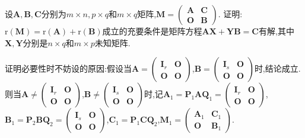 \documentclass[../../main.tex]{subfiles}%
\begin{document}
\begin{theorem}[Roth定理]\label{theorem:Roth消去定理}
设\(\boldsymbol{A},\boldsymbol{B},\boldsymbol{C}\)分别为\(m\times n,p\times q\)和\(m\times q\)矩阵,\(\boldsymbol{M}=\begin{pmatrix}
\boldsymbol{A}&\boldsymbol{C}\\
\boldsymbol{O}&\boldsymbol{B}
\end{pmatrix}\). 证明:\(\mathrm{r}(\boldsymbol{M})=\mathrm{r}(\boldsymbol{A})+\mathrm{r}(\boldsymbol{B})\)成立的充要条件是矩阵方程\(\boldsymbol{A}\boldsymbol{X}+\boldsymbol{Y}\boldsymbol{B}=\boldsymbol{C}\)有解,其中\(\boldsymbol{X},\boldsymbol{Y}\)分别是\(n\times q\)和\(m\times p\)未知矩阵.
\end{theorem}
\begin{note}
证明必要性时不妨设的原因:假设当\(\boldsymbol{A}=\begin{pmatrix}
\boldsymbol{I}_r & \boldsymbol{O} \\
\boldsymbol{O} & \boldsymbol{O}
\end{pmatrix}\),\(\boldsymbol{B}=\begin{pmatrix}
\boldsymbol{I}_s & \boldsymbol{O} \\
\boldsymbol{O} & \boldsymbol{O}
\end{pmatrix}\)时,结论成立.则当\(\boldsymbol{A}\neq\begin{pmatrix}
\boldsymbol{I}_r & \boldsymbol{O} \\
\boldsymbol{O} & \boldsymbol{O}
\end{pmatrix}\),\(\boldsymbol{B}\neq\begin{pmatrix}
\boldsymbol{I}_s & \boldsymbol{O} \\
\boldsymbol{O} & \boldsymbol{O}
\end{pmatrix}\)时,记\(\boldsymbol{A}_1 = \boldsymbol{P}_1\boldsymbol{AQ}_1=\begin{pmatrix}
\boldsymbol{I}_r & \boldsymbol{O} \\
\boldsymbol{O} & \boldsymbol{O}
\end{pmatrix}\),\(\boldsymbol{B}_1 = \boldsymbol{P}_2\boldsymbol{BQ}_2=\begin{pmatrix}
\boldsymbol{I}_{s} & \boldsymbol{O} \\
\boldsymbol{O} & \boldsymbol{O}
\end{pmatrix}\),\(\boldsymbol{C}_1 = \boldsymbol{P}_1\boldsymbol{CQ}_2\),\(\boldsymbol{M}_1=\begin{pmatrix}
\boldsymbol{A}_1 & \boldsymbol{C}_1 \\
\boldsymbol{O} & \boldsymbol{B}_1
\end{pmatrix}\).


\end{note}
\end{document}
